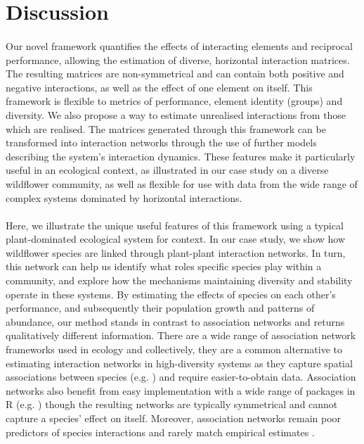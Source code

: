 \documentclass[a4,12pt]{article}
\begin{document}
    

\section{Discussion}
    



    \paragraph{} 
    Our novel framework quantifies the effects of interacting elements and reciprocal performance, allowing the estimation of diverse, horizontal interaction matrices. The resulting matrices are non-symmetrical and can contain both positive and negative interactions, as well as the effect of one element on itself. This framework is flexible to metrics of performance, element identity (groups) and diversity. We also propose a way to estimate unrealised interactions from those which are realised. The matrices generated through this framework can be transformed into interaction networks through the use of further models describing the system's interaction dynamics. These features make it particularly useful in an ecological context, as illustrated in our case study on a diverse wildflower community, as well as flexible for use with data from the wide range of complex systems dominated by horizontal interactions.

    \paragraph{}
    Here, we illustrate the unique useful features of this framework using a typical plant-dominated ecological system for context. In our case study, we show how wildflower species are linked through  plant-plant interaction networks. In turn, this network can help us identify what roles specific species play within a community, and explore how the mechanisms maintaining diversity and stability operate in these systems. By estimating the effects of species on each other's performance, and subsequently their population growth and patterns of abundance, our method stands in contrast to association networks and returns qualitatively different information. There are a wide range of association network frameworks used in ecology \parencite{Burns2010, Losapio2018, Montesinos-Navarro2018} and collectively, they are a common alternative to estimating interaction networks in high-diversity systems as they capture spatial associations between species (e.g. \cite{Saiz2018}) and require easier-to-obtain data. Association networks also benefit from easy implementation with a wide range of packages in R (e.g. \cite{Griffith2016}) though the resulting networks are typically symmetrical and cannot capture a species' effect on itself. Moreover, association networks remain poor predictors of species interactions and rarely match empirical estimates \parencite{Sander2017,Barner2018, Thurman2019, Blanchet2020}.
\end{document}
